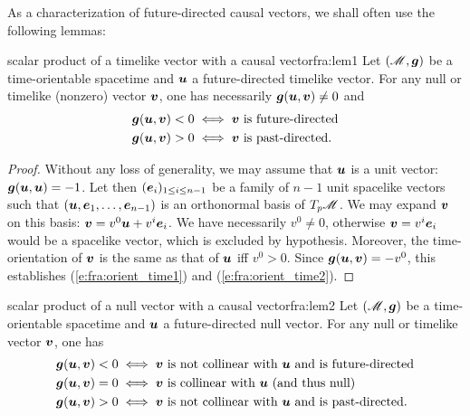 As a characterization of future-directed causal vectors,
we shall often use the following lemmas:

\begin{tlemma}{scalar product of a timelike vector with a causal vector}{fra:lem1}
Let $(\mathscr{M},\bm{g})$ be a time-orientable spacetime and $\bm{u}$ a future-directed
timelike vector. For any null or timelike (nonzero) vector $\bm{v}$, one has necessarily
$\bm{g}(\bm{u},\bm{v}) \neq 0$ and
\begin{subequations}
\begin{align}
& \bm{g}(\bm{u},\bm{v}) < 0 \iff \bm{v} \ \mbox{is future-directed} \label{e:fra:orient_time1} \\
& \bm{g}(\bm{u},\bm{v}) > 0 \iff \bm{v} \ \mbox{is past-directed} . \label{e:fra:orient_time2}
\end{align}
\end{subequations}
\end{tlemma}

\begin{proof}
Without any loss of generality, we may assume that $\bm{u}$ is a unit vector: $\bm{g}(\bm{u},\bm{u}) = -1$.
Let then $(\bm{e}_i)_{1\leq i \leq n-1}$ be a family of $n-1$ unit spacelike vectors such
that $(\bm{u},\bm{e}_1,\ldots,\bm{e}_{n-1})$ is an orthonormal basis of $T_p\mathscr{M}$.
We may expand $\bm{v}$ on this basis: $\bm{v} = v^0 \bm{u} + v^i \bm{e}_i$.
We have
necessarily $v^0 \not = 0$, otherwise $\bm{v} = v^i \bm{e}_i$ would be a spacelike
vector, which is excluded by hypothesis.
Moreover, the time-orientation of $\bm{v}$ is the same as that of $\bm{u}$
iff $v^0>0$. Since $\bm{g}(\bm{u},\bm{v}) = - v^0$, this
establishes (\ref{e:fra:orient_time1}) and (\ref{e:fra:orient_time2}).
\end{proof}

\begin{tlemma}{scalar product of a null vector with a causal vector}{fra:lem2}
Let $(\mathscr{M},\bm{g})$ be a time-orientable spacetime and $\bm{u}$ a future-directed
null vector. For any null or timelike vector $\bm{v}$, one has
\begin{subequations}
\begin{align}
& \bm{g}(\bm{u},\bm{v}) < 0 \iff \bm{v} \ \mbox{is not collinear with $\bm{u}$ and is future-directed} \label{e:fra:orient_null1} \\
& \bm{g}(\bm{u},\bm{v}) = 0 \iff \mbox{$\bm{v}$ is collinear with $\bm{u}$ (and thus null)} \label{e:fra:orient_null2} \\
& \bm{g}(\bm{u},\bm{v}) > 0 \iff \bm{v} \ \mbox{is not collinear with $\bm{u}$ and is past-directed} . \label{e:fra:orient_null3}
\end{align}
\end{subequations}
\end{tlemma}

